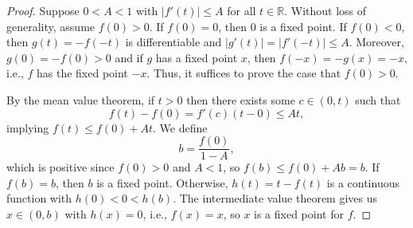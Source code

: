 \documentclass[12pt]{article}
\theoremstyle{definition}
\newcommand{\R}{\mathbb{R}}
\begin{document}
\begin{proof}
    Suppose $0 < A < 1$ with $|f'(t)| \leq A$ for all $t \in \R$. Without loss of generality, assume $f(0) > 0$. If $f(0) = 0$, then $0$ is a fixed point. If $f(0) < 0$, then $g(t) = -f(-t)$ is differentiable and $|g'(t)| = |f'(-t)| \leq A$. Moreover, $g(0) = -f(0) > 0$ and if $g$ has a fixed point $x$, then $f(-x) = -g(x) = -x$, i.e., $f$ has the fixed point $-x$. Thus, it suffices to prove the case that $f(0) > 0$.
    
    By the mean value theorem, if $t > 0$ then there exists some $c \in (0, t)$ such that
    \[
      f(t) - f(0) = f'(c)(t - 0) \leq At,
    \]
    implying $f(t) \leq f(0) + At$. We define
    \[
        b = \frac{f(0)}{1 - A},
    \]
    which is positive since $f(0) > 0$ and $A < 1$, so $f(b) \leq f(0) + Ab = b$. If $f(b) = b$, then $b$ is a fixed point. Otherwise, $h(t) = t - f(t)$ is a continuous function with $h(0) < 0 < h(b)$. The intermediate value theorem gives us $x \in (0, b)$ with $h(x) = 0$, i.e., $f(x) = x$, so $x$ is a fixed point for $f$.
    
\end{proof}
\end{document}

